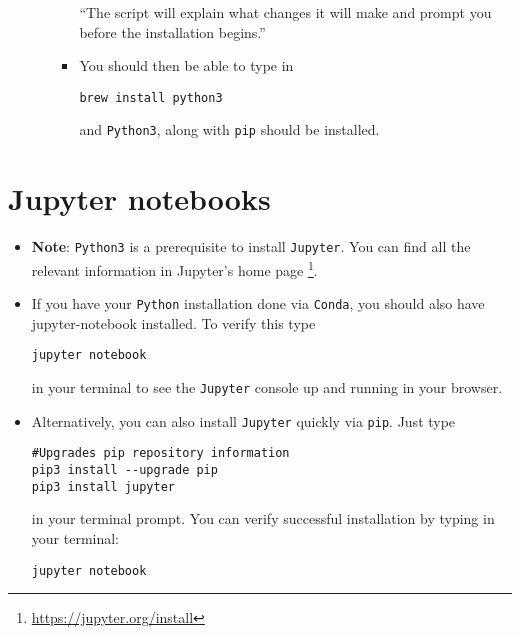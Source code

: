 \documentclass[11pt]{article}
\begin{document}
\begin{itemize}
\begin{itemize}
\begin{itemize}
``The script will explain what changes it will make and prompt you before the installation begins.''

\item You should then be able to type in
\begin{verbatim}
brew install python3
\end{verbatim}
and \texttt{Python3}, along with \texttt{pip} should be installed.
\end{itemize}
\end{itemize}
\end{itemize}

\section*{Jupyter notebooks}
\label{sec:org51157f0}
\begin{itemize}
\item \textbf{Note}: \texttt{Python3} is a prerequisite to install \texttt{Jupyter}. You can find all the
relevant information in Jupyter's home page \footnote{\url{https://jupyter.org/install}}.
\item If you have your \texttt{Python} installation done via \texttt{Conda}, you should also have
jupyter-notebook installed. To verify this type
\begin{verbatim}
jupyter notebook
\end{verbatim}
in your terminal to see the \texttt{Jupyter} console up and running in your browser.
\item Alternatively, you can also install \texttt{Jupyter} quickly via \texttt{pip}. Just type
\begin{verbatim}
#Upgrades pip repository information
pip3 install --upgrade pip
pip3 install jupyter
\end{verbatim}
in your terminal prompt. You can verify successful installation by typing in
your terminal:
\begin{verbatim}
jupyter notebook
\end{verbatim}
\end{itemize}
\end{document}
